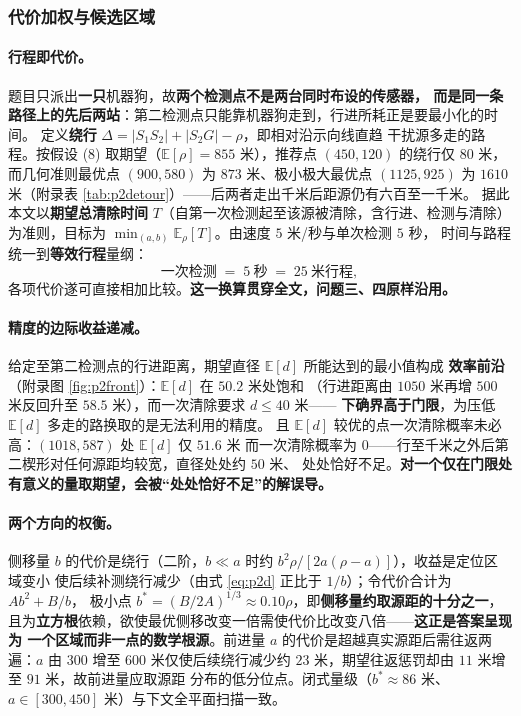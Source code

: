 \documentclass[withoutpreface, bwprint]{cumcmthesis}
\begin{document}
\subsubsection{代价加权与候选区域}
\label{sec:p2region}

\paragraph{行程即代价。}
题目只派出\textbf{一只}机器狗，故\textbf{两个检测点不是两台同时布设的传感器，
而是同一条路径上的先后两站}：第二检测点只能靠机器狗走到，行进所耗正是要最小化的时间。
定义\textbf{绕行} $\Delta=\lvert S_1S_2\rvert+\lvert S_2G\rvert-\rho$，即相对沿示向线直趋
干扰源多走的路程。按假设 (8) 取期望（$\mathbb{E}[\rho]=855$ 米），推荐点 $(450,120)$
的绕行仅 $80$ 米，而几何准则最优点 $(900,580)$ 为 $873$ 米、极小极大最优点 $(1125,925)$
为 $1610$ 米（附录表 \ref{tab:p2detour}）——后两者走出千米后距源仍有六百至一千米。
据此本文以\textbf{期望总清除时间} $T$（自第一次检测起至该源被清除，含行进、检测与清除）
为准则，目标为 $\min_{(a,b)}\mathbb{E}_\rho[T]$。由速度 $5$ 米/秒与单次检测 $5$ 秒，
时间与路程统一到\textbf{等效行程}量纲：
\begin{equation}
  \text{一次检测}\;=\;5\ \text{秒}\;=\;25\ \text{米行程},
  \label{eq:p2exch}
\end{equation}
各项代价遂可直接相加比较。\textbf{这一换算贯穿全文，问题三、四原样沿用。}

\paragraph{精度的边际收益递减。}
给定至第二检测点的行进距离，期望直径 $\mathbb{E}[d]$ 所能达到的最小值构成
\textbf{效率前沿}（附录图 \ref{fig:p2front}）：$\mathbb{E}[d]$ 在 $50.2$ 米处饱和
（行进距离由 $1050$ 米再增 $500$ 米反回升至 $58.5$ 米），而一次清除要求 $d\le40$ 米——
\textbf{下确界高于门限}，为压低 $\mathbb{E}[d]$ 多走的路换取的是无法利用的精度。
且 $\mathbb{E}[d]$ 较优的点一次清除概率未必高：$(1018,587)$ 处 $\mathbb{E}[d]$ 仅 $51.6$ 米
而一次清除概率为 $0$——行至千米之外后第二楔形对任何源距均较宽，直径处处约 $50$ 米、
处处恰好不足。\textbf{对一个仅在门限处有意义的量取期望，会被“处处恰好不足”的解误导。}

\paragraph{两个方向的权衡。}
侧移量 $b$ 的代价是绕行（二阶，$b\ll a$ 时约 $b^2\rho/[2a(\rho-a)]$），收益是定位区域变小
使后续补测绕行减少（由式 \eqref{eq:p2d} 正比于 $1/b$）；令代价合计为 $Ab^2+B/b$，
极小点 $b^{*}=(B/2A)^{1/3}\approx0.10\rho$，即\textbf{侧移量约取源距的十分之一}，
且为\textbf{立方根}依赖，欲使最优侧移改变一倍需使代价比改变八倍——\textbf{这正是答案呈现为
一个区域而非一点的数学根源}。前进量 $a$ 的代价是超越真实源距后需往返两遍：$a$ 由 $300$ 增至
$600$ 米仅使后续绕行减少约 $23$ 米，期望往返惩罚却由 $11$ 米增至 $91$ 米，故前进量应取源距
分布的低分位点。闭式量级（$b^{*}\approx86$ 米、$a\in[300,450]$ 米）与下文全平面扫描一致。
\end{document}
